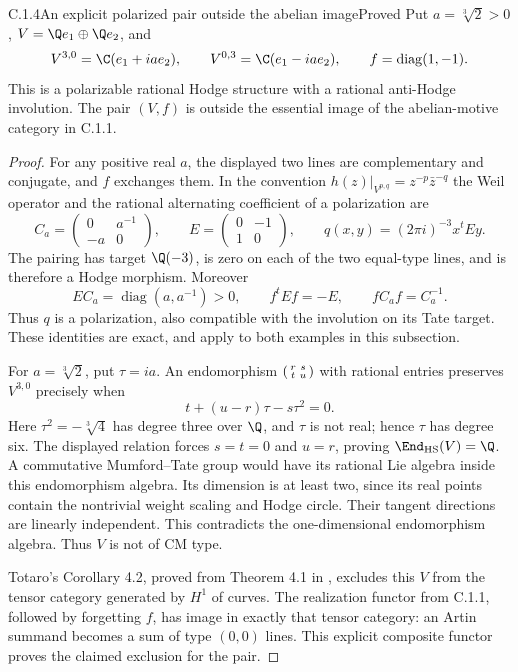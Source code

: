 \begin{result}{C.1.4}{An explicit polarized pair outside the abelian image}{Proved}
Put $a=\sqrt[3]{2}>0$, $V=\Q e_1\oplus\Q e_2$, and
\[
 V^{3,0}=\C(e_1+ia e_2),\qquad
 V^{0,3}=\C(e_1-ia e_2),\qquad f=\operatorname{diag}(1,-1).
\]
This is a polarizable rational Hodge structure with a rational anti-Hodge involution. The pair $(V,f)$ is outside the essential image of the abelian-motive category in C.1.1.
\end{result}
\begin{proof}
For any positive real $a$, the displayed two lines are complementary and conjugate, and $f$ exchanges them. In the convention $h(z)|_{V^{p,q}}=z^{-p}\bar z^{-q}$ the Weil operator and the rational alternating coefficient of a polarization are
\[
 C_a=\begin{pmatrix}0&a^{-1}\\-a&0\end{pmatrix},\qquad
 E=\begin{pmatrix}0&-1\\1&0\end{pmatrix},\qquad
 q(x,y)=(2\pi i)^{-3}x^tEy.
\]
The pairing has target $\Q(-3)$, is zero on each of the two equal-type lines, and is therefore a Hodge morphism. Moreover
\[
 EC_a=\operatorname{diag}(a,a^{-1})>0,\qquad
 f^tEf=-E,\qquad fC_af=C_a^{-1}.
\]
Thus $q$ is a polarization, also compatible with the involution on its Tate target. These identities are exact, and apply to both examples in this subsection.

For $a=\sqrt[3]{2}$, put $\tau=ia$. An endomorphism $\begin{psmallmatrix}r&s\\t&u\end{psmallmatrix}$ with rational entries preserves $V^{3,0}$ precisely when
\[
 t+(u-r)\tau-s\tau^2=0.
\]
Here $\tau^2=-\sqrt[3]{4}$ has degree three over $\Q$, and $\tau$ is not real; hence $\tau$ has degree six. The displayed relation forces $s=t=0$ and $u=r$, proving $\End_{\mathrm{HS}}(V)=\Q$. A commutative Mumford--Tate group would have its rational Lie algebra inside this endomorphism algebra. Its dimension is at least two, since its real points contain the nontrivial weight scaling and Hodge circle. Their tangent directions are linearly independent. This contradicts the one-dimensional endomorphism algebra. Thus $V$ is not of CM type.

Totaro's Corollary 4.2, proved from Theorem 4.1 in \cite[p.~18]{TotaroHodge2015}, excludes this $V$ from the tensor category generated by $H^1$ of curves. The realization functor from C.1.1, followed by forgetting $f$, has image in exactly that tensor category: an Artin summand becomes a sum of type $(0,0)$ lines. This explicit composite functor proves the claimed exclusion for the pair.
\end{proof}


